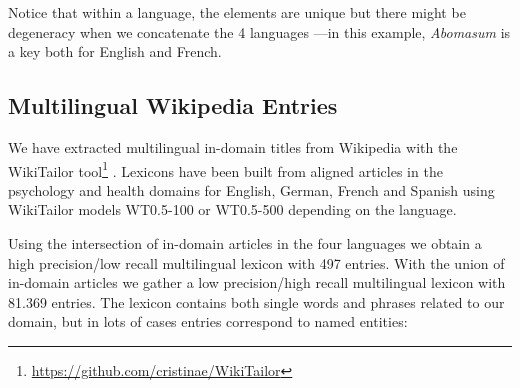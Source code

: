 \documentclass[a4paper,11pt]{article}
\begin{document}

Notice that within a language, the elements are unique but there might be degeneracy when we concatenate the 4 languages ---in this example, \emph{Abomasum} is a key both for English and French.

\subsection{Multilingual Wikipedia Entries}
\label{ss:wpLex}


We have extracted multilingual in-domain titles from Wikipedia with the WikiTailor tool\footnote{\url{https://github.com/cristinae/WikiTailor}}
 \cite{barronEtAl:2015}. 
Lexicons have been built from aligned articles in the psychology and health domains for English, German, French and Spanish using WikiTailor models WT0.5-100 or WT0.5-500 depending on the language.

Using the intersection of in-domain articles in the four languages we obtain a high precision/low recall multilingual lexicon with 497 entries. With the union of in-domain articles we gather a low precision/high recall multilingual lexicon with 81.369 entries. 
The lexicon contains both single words and phrases related to our domain, but in lots of cases entries correspond to named entities:
\end{document}
